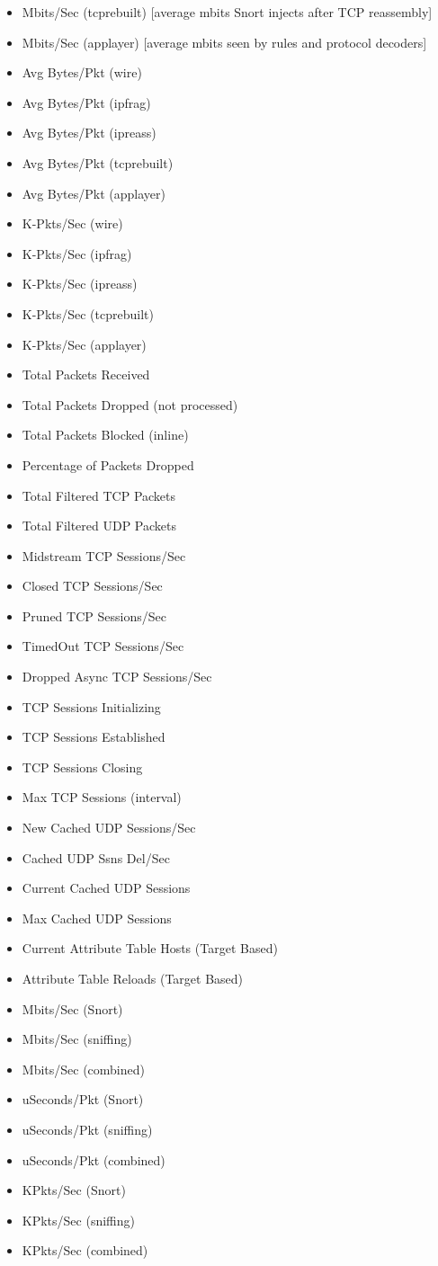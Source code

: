 \documentclass[english]{report}
\begin{document}
\begin{itemize}
\item Mbits/Sec (tcprebuilt) [average mbits Snort injects after TCP reassembly]
\item Mbits/Sec (applayer) [average mbits seen by rules and protocol decoders]
\item Avg Bytes/Pkt (wire)
\item Avg Bytes/Pkt (ipfrag)
\item Avg Bytes/Pkt (ipreass)
\item Avg Bytes/Pkt (tcprebuilt)
\item Avg Bytes/Pkt (applayer)
\item K-Pkts/Sec (wire)
\item K-Pkts/Sec (ipfrag)
\item K-Pkts/Sec (ipreass)
\item K-Pkts/Sec (tcprebuilt)
\item K-Pkts/Sec (applayer)
\item Total Packets Received
\item Total Packets Dropped (not processed)
\item Total Packets Blocked (inline)
\item Percentage of Packets Dropped
\item Total Filtered TCP Packets
\item Total Filtered UDP Packets
\item Midstream TCP Sessions/Sec
\item Closed TCP Sessions/Sec
\item Pruned TCP Sessions/Sec
\item TimedOut TCP Sessions/Sec
\item Dropped Async TCP Sessions/Sec
\item TCP Sessions Initializing
\item TCP Sessions Established
\item TCP Sessions Closing
\item Max TCP Sessions (interval)
\item New Cached UDP Sessions/Sec
\item Cached UDP Ssns Del/Sec
\item Current Cached UDP Sessions
\item Max Cached UDP Sessions
\item Current Attribute Table Hosts (Target Based)
\item Attribute Table Reloads (Target Based)
\item Mbits/Sec (Snort)
\item Mbits/Sec (sniffing)
\item Mbits/Sec (combined)
\item uSeconds/Pkt (Snort)
\item uSeconds/Pkt (sniffing)
\item uSeconds/Pkt (combined)
\item KPkts/Sec (Snort)
\item KPkts/Sec (sniffing)
\item KPkts/Sec (combined)
\end{itemize}
\end{document}
